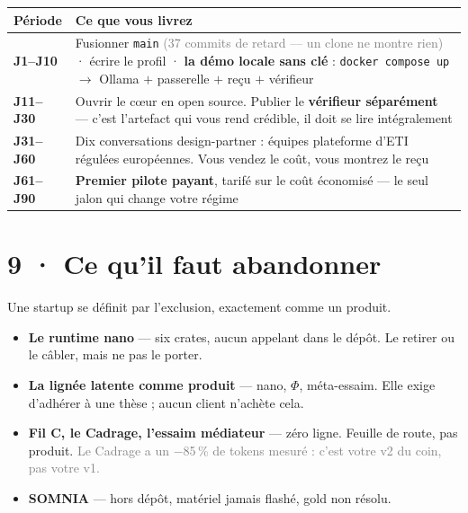 \documentclass[10pt]{article}
\newcommand{\sz}[1]{\textcolor{grey}{\small\textsf{#1}}}
\newcommand{\code}[1]{\texttt{\small #1}}
\newcommand{\pc}{\,\%}
\begin{document}
\renewcommand{\arraystretch}{1.25}
\begin{center}\small
\begin{tabular}{@{}>{\raggedright\arraybackslash}p{2.2cm} >{\raggedright\arraybackslash}p{13.4cm}@{}}
\toprule
\textbf{Période} & \textbf{Ce que vous livrez} \\
\midrule
\textbf{J1--J10} & Fusionner \code{main} \sz{(37 commits de retard --- un clone ne montre rien)} · écrire le profil · \textbf{la démo locale sans clé} : \code{docker compose up} $\rightarrow$ Ollama $+$ passerelle $+$ reçu $+$ vérifieur \\
\textbf{J11--J30} & Ouvrir le cœur en open source. Publier le \textbf{vérifieur séparément} --- c'est l'artefact qui vous rend crédible, il doit se lire intégralement \\
\textbf{J31--J60} & Dix conversations design-partner : équipes plateforme d'ETI régulées européennes. Vous vendez le coût, vous montrez le reçu \\
\textbf{J61--J90} & \textbf{Premier pilote payant}, tarifé sur le coût économisé --- le seul jalon qui change votre régime \\
\bottomrule
\end{tabular}
\end{center}

\section{9 · Ce qu'il faut abandonner}

Une startup se définit par l'exclusion, exactement comme un produit.

\begin{itemize}[leftmargin=1.2em,itemsep=2pt,topsep=2pt]
\item \textbf{Le runtime nano} --- six crates, aucun appelant dans le dépôt. Le retirer ou le câbler,
      mais ne pas le porter.
\item \textbf{La lignée latente comme produit} --- nano, $\Phi$, méta-essaim. Elle exige d'adhérer à
      une thèse ; aucun client n'achète cela.
\item \textbf{Fil C, le Cadrage, l'essaim médiateur} --- zéro ligne. Feuille de route, pas produit.
      \sz{Le Cadrage a un $-$85\pc{} de tokens mesuré : c'est votre v2 du coin, pas votre v1.}
\item \textbf{SOMNIA} --- hors dépôt, matériel jamais flashé, gold non résolu.
\end{itemize}
\end{document}
